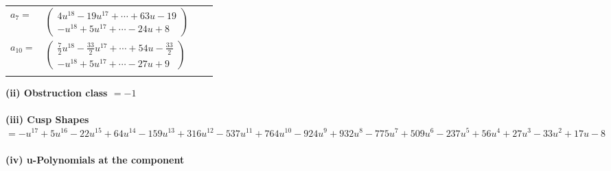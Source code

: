 \documentclass[1p]{elsarticle_modified}
\theoremstyle{definition}
\begin{document}
\begin{tabular}{m{7pt} m{180pt} m{7pt} m{180pt} }
\flushright $a_{7}=$&$\begin{pmatrix}4 u^{18}-19 u^{17}+\cdots+63 u-19\\- u^{18}+5 u^{17}+\cdots-24 u+8\end{pmatrix}$ \\
\flushright $a_{10}=$&$\begin{pmatrix}\frac{7}{2} u^{18}-\frac{33}{2} u^{17}+\cdots+54 u-\frac{33}{2}\\- u^{18}+5 u^{17}+\cdots-27 u+9\end{pmatrix}$\\&\end{tabular}
\flushleft \textbf{(ii) Obstruction class $= -1$}\\~\\
\flushleft \textbf{(iii) Cusp Shapes $= - u^{17}+5 u^{16}-22 u^{15}+64 u^{14}-159 u^{13}+316 u^{12}-537 u^{11}+764 u^{10}-924 u^9+932 u^8-775 u^7+509 u^6-237 u^5+56 u^4+27 u^3-33 u^2+17 u-8$}\\~\\
\newpage\renewcommand{\arraystretch}{1}
\flushleft \textbf{(iv) u-Polynomials at the component}\newline \\
\end{document}
